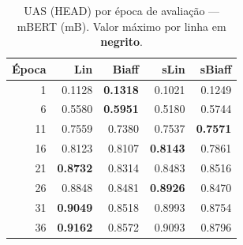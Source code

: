 \clearpage
\begin{table}[p]
\centering
\caption{UAS (HEAD) por \'epoca de avalia\c{c}\~ao --- mBERT (mB).
Valor m\'aximo por linha em \textbf{negrito}.}
\label{tab:instab-mb-head}
\begingroup
\small\setlength{\tabcolsep}{10pt}\renewcommand{\arraystretch}{1.2}%
\begin{tabular}{r r r r r}
\toprule
\textbf{\'Epoca} & \textbf{Lin} & \textbf{Biaff} & \textbf{sLin} & \textbf{sBiaff} \\
\midrule
   1 & 0.1128 & \textbf{0.1318} & 0.1021 & 0.1249 \\
   6 & 0.5580 & \textbf{0.5951} & 0.5180 & 0.5744 \\
  11 & 0.7559 & 0.7380 & 0.7537 & \textbf{0.7571} \\
  16 & 0.8123 & 0.8107 & \textbf{0.8143} & 0.7861 \\
  21 & \textbf{0.8732} & 0.8314 & 0.8483 & 0.8516 \\
  26 & 0.8848 & 0.8481 & \textbf{0.8926} & 0.8470 \\
  31 & \textbf{0.9049} & 0.8518 & 0.8993 & 0.8754 \\
  36 & \textbf{0.9162} & 0.8572 & 0.9093 & 0.8796 \\
\bottomrule
\end{tabular}
\endgroup
\instablegendaFull
\end{table}

